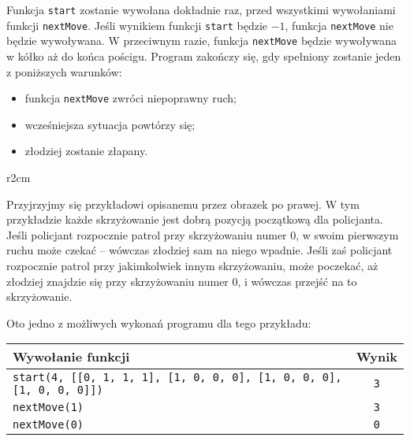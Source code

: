 \documentclass{boi2014-pl}
\renewcommand{\method}[1]{{\tt #1}}
\newcommand{\constant}[1]{{\tt #1}}
\begin{document}
    Funkcja \method{start} zostanie wywołana dokładnie raz,
    przed wszystkimi wywołaniami funkcji \method{nextMove}.
    Jeśli wynikiem funkcji \method{start} będzie $-1$,
    funkcja \method{nextMove} nie będzie wywoływana.
    W przeciwnym razie, funkcja \method{nextMove} będzie wywoływana w kółko
    aż do końca pościgu.
    Program zakończy się, gdy spełniony zostanie jeden z poniższych warunków:
    \begin{itemize}
        \item funkcja \method{nextMove} zwróci niepoprawny ruch;
        \item wcześniejsza sytuacja powtórzy się;
        \item złodziej zostanie złapany.
    \end{itemize}

    \Example
    \begin{wrapfigure}[4]{r}{2cm}
        \vspace{-0.5cm}
        \centering
    \end{wrapfigure}
    Przyjrzyjmy się przykładowi opisanemu przez obrazek po prawej.
    W tym przykładzie każde skrzyżowanie jest dobrą pozycją początkową dla policjanta.
    Jeśli policjant rozpocznie patrol przy skrzyżowaniu numer 0, w swoim pierwszym ruchu
    może czekać -- wówczas złodziej sam na niego wpadnie.
    Jeśli zaś policjant rozpocznie patrol przy jakimkolwiek innym skrzyżowaniu, może poczekać,
    aż złodziej znajdzie się przy skrzyżowaniu numer 0, i wówczas przejść na to skrzyżowanie.
   
    Oto jedno z możliwych wykonań programu dla tego przykładu:

    \begin{tabular}{|l|c|}
        \hline
            {\bf Wywołanie funkcji} & {\bf Wynik} \\
        \hline
            \method{start(4, [[0, 1, 1, 1], [1, 0, 0, 0], [1, 0, 0, 0], [1, 0, 0, 0]])} &
            \constant{3} \\
        \hline
            \method{nextMove(1)} & \constant{3} \\
        \hline
            \method{nextMove(0)} & \constant{0} \\
        \hline
    \end{tabular}
\end{document}
